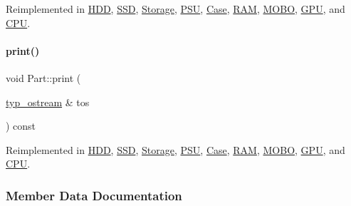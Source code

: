 Reimplemented in \mbox{\hyperlink{class_h_d_d_a0e48767713740f3ec7dafd907d3570b1}{H\+DD}}, \mbox{\hyperlink{class_s_s_d_a7efed56d8590399c61d8eefca9295c91}{S\+SD}}, \mbox{\hyperlink{class_storage_a53fc5b4814df41517b9f2be8dcef605e}{Storage}}, \mbox{\hyperlink{class_p_s_u_a57f14e0dee163f33d01cdbb159b6d9d6}{P\+SU}}, \mbox{\hyperlink{class_case_a580b6870ea256cab7e7eee36820803e7}{Case}}, \mbox{\hyperlink{class_r_a_m_ac2d5a8bd858289b6679e429bbe15fb20}{R\+AM}}, \mbox{\hyperlink{class_m_o_b_o_a01fed4470cbf8c58f86426aa8f52b225}{M\+O\+BO}}, \mbox{\hyperlink{class_g_p_u_a27cb964d5ce05efa75cb65d836b922e1}{G\+PU}}, and \mbox{\hyperlink{class_c_p_u_a2f130a0263e32387554c128aedb6f9ed}{C\+PU}}.

\mbox{\label{class_part_ab6396030e8b7a724731a8b54bd4942fc}} 
\paragraph{\texorpdfstring{print()}{print()}\hspace{0.1cm}{\footnotesize\ttfamily [4/4]}}
{\footnotesize\ttfamily void Part\+::print (\begin{DoxyParamCaption}\item[{\mbox{\hyperlink{structtyp__ostream}{typ\+\_\+ostream}} \&}]{tos }\end{DoxyParamCaption}) const\hspace{0.3cm}{\ttfamily [virtual]}}



Reimplemented in \mbox{\hyperlink{class_h_d_d_a557271f835f56a25fe5c264019f20bb2}{H\+DD}}, \mbox{\hyperlink{class_s_s_d_a6e252152f8ba75043edec67e19d686e0}{S\+SD}}, \mbox{\hyperlink{class_storage_ad6c13f251a39612a7628980bf2f12918}{Storage}}, \mbox{\hyperlink{class_p_s_u_a3690cd51ec36d4a1417c22612793e01c}{P\+SU}}, \mbox{\hyperlink{class_case_a6cce910485e45c0b30018fce491c154f}{Case}}, \mbox{\hyperlink{class_r_a_m_ad43f71c742f078c98ab7fd9a26420c97}{R\+AM}}, \mbox{\hyperlink{class_m_o_b_o_a3dd7e36103afbb4b6c09b65975317b9c}{M\+O\+BO}}, \mbox{\hyperlink{class_g_p_u_ad54f6d21007e216f27dc738aea2de836}{G\+PU}}, and \mbox{\hyperlink{class_c_p_u_aa2cf81d7f0005da72c7a99b1b9459c27}{C\+PU}}.



\subsubsection{Member Data Documentation}
\mbox{\label{class_part_ae06f2fdeb7fbbdb229a7aca151f3e341}} 
